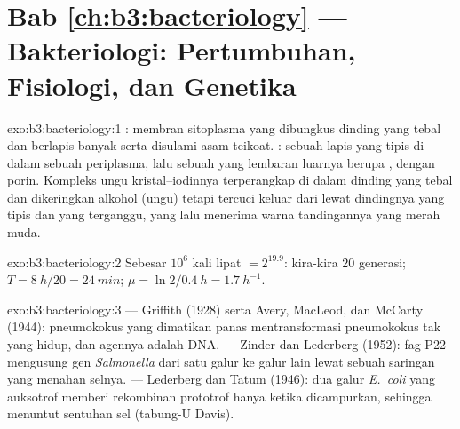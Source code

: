 \section*{Bab \ref{ch:b3:bacteriology} --- Bakteriologi: Pertumbuhan, Fisiologi, dan Genetika}

\begin{solution}{exo:b3:bacteriology:1}
: membran sitoplasma yang dibungkus dinding  yang
tebal dan berlapis banyak serta disulami asam teikoat. : sebuah
lapis  yang tipis di dalam sebuah periplasma, lalu sebuah  yang lembaran luarnya berupa , dengan porin. Kompleks ungu
kristal--iodinnya terperangkap di dalam dinding  yang tebal dan
dikeringkan alkohol (ungu) tetapi tercuci keluar dari  lewat
dindingnya yang tipis dan  yang terganggu, yang lalu menerima
warna tandingannya yang merah muda.
\end{solution}

\begin{solution}{exo:b3:bacteriology:2}
Sebesar $10^{6}$ kali lipat $= 2^{19.9}$: kira-kira $20$ generasi; $T = \qty{8}{h}/20
= \qty{24}{min}$; $\mu = \ln 2/\qty{0.4}{h} = \qty{1.7}{h^{-1}}$.
\end{solution}

\begin{solution}{exo:b3:bacteriology:3}
 --- Griffith (1928) serta Avery, MacLeod, dan McCarty
(1944): pneumokokus  yang dimatikan panas mentransformasi pneumokokus
tak  yang hidup, dan agennya adalah DNA.  --- Zinder dan
Lederberg (1952): fag P22 mengusung gen \emph{Salmonella} dari satu galur ke
galur lain lewat sebuah saringan yang menahan selnya.  --- Lederberg
dan Tatum (1946): dua galur \emph{E.~coli} yang auksotrof memberi
rekombinan prototrof hanya ketika dicampurkan, sehingga menuntut sentuhan sel
(tabung-U Davis).
\end{solution}

